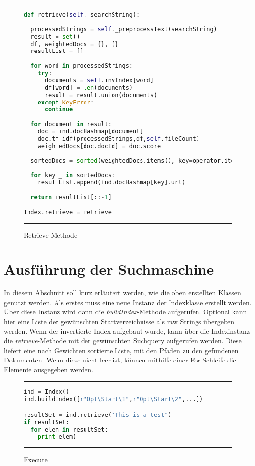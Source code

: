 \begin{figure}
	\rule{\textwidth}{0.4pt}
		\begin{lstlisting}[language=Python]
def retrieve(self, searchString):
 
  processedStrings = self._preprocessText(searchString)
  result = set()
  df, weightedDocs = {}, {}
  resultList = []
    
  for word in processedStrings:
    try:
      documents = self.invIndex[word]
      df[word] = len(documents)
      result = result.union(documents)
    except KeyError:
      continue
    
  for document in result:
    doc = ind.docHashmap[document]
    doc.tf_idf(processedStrings,df,self.fileCount)
    weightedDocs[doc.docId] = doc.score
        
  sortedDocs = sorted(weightedDocs.items(), key=operator.itemgetter(1))
    
  for key,_ in sortedDocs:
    resultList.append(ind.docHashmap[key].url)
        
  return resultList[::-1]

Index.retrieve = retrieve
		\end{lstlisting}
	\rule{\textwidth}{0.4pt}
	\caption{Retrieve-Methode}
	\label{fig:retrieve}
\end{figure}

\section{Ausführung der Suchmaschine}

In diesem Abschnitt soll kurz erläutert werden, wie die oben erstellten Klassen genutzt werden. Als erstes muss eine neue Instanz der Indexklasse erstellt werden. Über diese Instanz wird dann die \textit{buildIndex}-Methode aufgerufen. Optional kann hier eine Liste der gewünschten Startverzeichnisse als raw Strings übergeben werden. Wenn der invertierte Index aufgebaut wurde, kann über die Indexinstanz die \textit{retrieve}-Methode mit der gewünschten Suchquery aufgerufen werden. Diese liefert eine nach Gewichten sortierte Liste, mit den Pfaden zu den gefundenen Dokumenten. Wenn diese nicht leer ist, können mithilfe einer For-Schleife die Elemente ausgegeben werden.

\begin{figure}
	\rule{\textwidth}{0.4pt}
		\begin{lstlisting}[language=Python]
ind = Index()
ind.buildIndex([r"Opt\Start\1",r"Opt\Start\2",...])

resultSet = ind.retrieve("This is a test")
if resultSet:
  for elem in resultSet:
    print(elem)
		\end{lstlisting}
	\rule{\textwidth}{0.4pt}
	\caption{Execute}
	\label{fig:execute}
\end{figure}